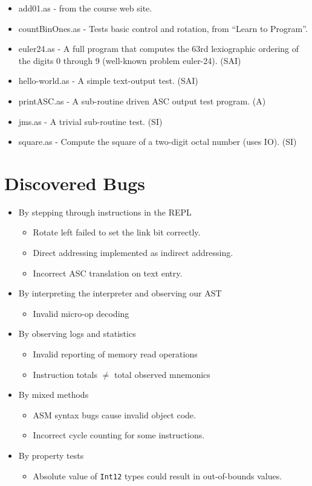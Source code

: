 \documentclass[11pt]{exam}
\def\Int{\texttt{Int12}}
\begin{document}
\begin{itemize}
\item add01.as - from the course web site.
\item countBinOnes.as - Tests basic control and rotation, from ``Learn to Program''.
\item euler24.as - A full program that computes the 63rd lexiographic ordering of
  the digits 0 through 9 (well-known problem euler-24). (SAI)
\item hello-world.as - A simple text-output test. (SAI)
\item printASC.as - A sub-routine driven ASC output test program.  (A)
\item jms.as - A trivial sub-routine test. (SI)
\item square.as - Compute the square of a two-digit octal number (uses IO).  (SI)
\end{itemize}

\section{Discovered Bugs}
\begin{itemize}
\item By stepping through instructions in the REPL
 \begin{itemize}
 \item Rotate left failed to set the link bit correctly.
 \item Direct addressing implemented as indirect addressing.
 \item Incorrect ASC translation on text entry.
 \end{itemize}

\item By interpreting the interpreter and observing our AST
 \begin{itemize}
 \item Invalid micro-op decoding
 \end{itemize}

\item By observing logs and statistics
 \begin{itemize}
 \item Invalid reporting of memory read operations
 \item Instruction totals $\neq$ total observed mnemonics
 \end{itemize}

\item By mixed methods
 \begin{itemize}
 \item ASM syntax bugs cause invalid object code.
 \item Incorrect cycle counting for some instructions.
 \end{itemize}

\item By property tests
 \begin{itemize}
 \item Absolute value of \Int{} types could result in out-of-bounds values.
 \end{itemize}
\end{itemize}
\end{document}
